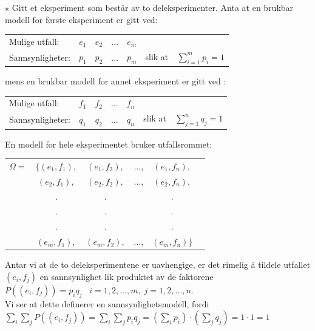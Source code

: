 \small
 
$\star$ Gitt et eksperiment som består av to deleksperimenter. 
Anta at en brukbar modell for første eksperiment er gitt ved:

\begin{center}
\begin{tabular}{lccccl}
Mulige utfall:  &  $e_1$&$e_2$&$\ldots $&$e_m$& \\
Sannsynligheter:&  $p_1$&$p_2$&$\ldots $&$p_m$&slik at\ \ $\sum_{i=1}^{m}p_i=1$
\end{tabular}
\end{center}
mens en brukbar modell for annet eksperiment er gitt ved :
\begin{center}
\begin{tabular}{lccccl}
Mulige utfall:  & $f_1$&$f_2$&$\ldots $&$f_n$& \\
Sannsynligheter:& $q_{1}$&$q_{2}$&$\ldots $&$q_{n}$&slik at\ \ $\sum_{j=1}^{n}q_{j}=1$
\end{tabular}
\end{center}
En modell for hele eksperimentet bruker utfallsrommet:
\begin{center}
\begin{tabular}{rccccc}
    $\Omega =$&$\{(e_1, f_1),$&$(e_1, f_2),$&$\ldots$,&$(e_1, f_n),$ \\
              &$  (e_2, f_1),$&$(e_2, f_2),$&$\ldots$,&$(e_2, f_n),$ \\
              &        .     &       .     &       &       .      \\
              &        .     &       .     &       &       .      \\
              &        .     &       .     &       &       .      \\
              &$(e_m, f_1),$&$(e_m, f_2),$&$\ldots$,&$(e_m, f_n)\}$ 
\end{tabular}
\end{center}
Antar vi at de to deleksperimentene er uavhengige, er det rimelig å
tildele utfallet $(e_i,f_j)$ en sannsynlighet lik produktet av de
faktorene \\ 

      $P((e_i, f_j))=p_iq_{j}$ \ $i=1,2,\ldots ,m,\; j=1,2,\ldots ,n$. \\

\noindent Vi ser at dette definerer en sannsynlighetsmodell, fordi \\

 $    \sum_{i} \sum_{j} P((e_i,f_j))=\sum_{i} \sum_{j} p_iq_{j}
        =(\sum_{i} p_i) \cdot (\sum_{j}q_{j})= 1 \cdot 1=1 $ \\

